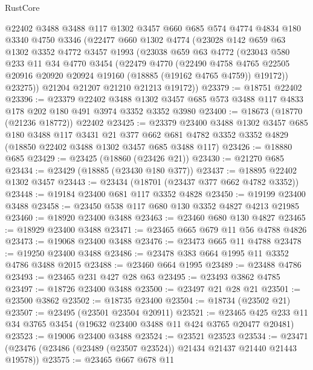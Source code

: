 \begin{lexlean}{RustCore}
\begin{coremodule}
    @22402
    @3488
    @3488
    @117
    @1302
    @3457
    @660
    @685
    @574
    @4774
    @4834
    @180
    @3340
    @4750
    @3346
    (@22477
      @660
      @1302
      @4774
      (@23028
        @142
        @659
        @63
        @1302
        @3352
        @4772
        @3457
        @1993
        (@23038
          @659
          @63
          @4772
          (@23043
            @580
            @233
            @11
            @34
            @4770
            @3454
            (@22479
              @4770
              (@22490
                @4758
                @4765
                @22505
                @20916
                @20920
                @20924
                @19160
                (@18885 (@19162 @4765 @4759))
                @19172))
            @23275))
        @21204
        @21207
        @21210
        @21213
        @19172))
@23379 := @18751 @22402
@23396 := @23379
    @22402
    @3488
    @1302
    @3457
    @685
    @573
    @3488
    @117
    @4833
    @178
    @202
    @180
    @491
    @3974
    @3352
    @3352
    @3980
@23400 := @18673 (@18770 (@21236 @18772)) @22402
@23425 := @23379
    @23400
    @3488
    @1302
    @3457
    @685
    @180
    @3488
    @117
    @3431
    @21
    @377
    @662
    @681
    @4782
    @3352
    @3352
    @4829
    (@18850 @22402 @3488 @1302 @3457 @685 @3488 @117)
@23426 := @18880 @685
@23429 := @23425 (@18860 (@23426 @21))
@23430 := @21270 @685
@23434 := @23429 (@18885 (@23430 @180 @377))
@23437 := @18895 @22402 @1302 @3457
@23443 := @23434 (@18701 (@23437 @377 @662 @4782 @3352))
@23448 := @19184 @23400 @681 @117 @3352 @4828
@23450 := @19199 @23400 @3488
@23458 := @23450 @538 @117 @680 @130 @3352 @4827 @4213 @21985
@23460 := @18920 @23400 @3488
@23463 := @23460 @680 @130 @4827
@23465 := @18929 @23400 @3488
@23471 := @23465 @665 @679 @11 @56 @4788 @4826
@23473 := @19068 @23400 @3488
@23476 := @23473 @665 @11 @4788
@23478 := @19250 @23400 @3488
@23486 := @23478 @383 @664 @1995 @11 @3352 @4786 @3488 @2015
@23488 := @23460 @664 @1995
@23489 := @23488 @4786
@23493 := @23465 @231 @427 @28 @63
@23495 := @23493 @3862 @4785
@23497 := @18726 @23400 @3488
@23500 := @23497 @21 @28 @21
@23501 := @23500 @3862
@23502 := @18735 @23400
@23504 := @18734 (@23502 @21)
@23507 := @23495 (@23501 @23504 @20911)
@23521 := @23465 @425 @233 @11 @34 @3765 @3454 (@19632 @23400 @3488 @11 @424 @3765 @20477 @20481)
@23523 := @19006 @23400 @3488
@23524 := @23521 @23523
@23534 := @23471 (@23476 (@23486 (@23489 (@23507 @23524)) @21434 @21437 @21440 @21443 @19578))
@23575 := @23465
    @667
    @678
    @11

\end{coremodule}
\end{lexlean}
